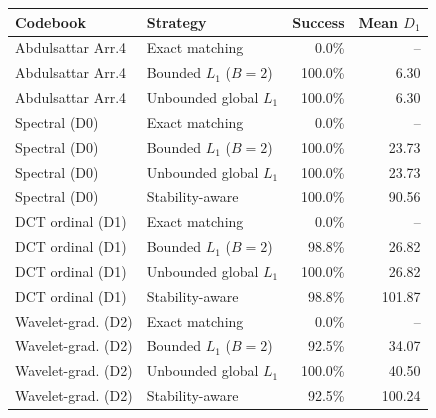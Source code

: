 \begin{tabular}{llrr}
\toprule
\textbf{Codebook} & \textbf{Strategy} & \textbf{Success} & \textbf{Mean $D_1$} \\
\midrule
Abdulsattar Arr.4 & Exact matching & 0.0\% & -- \\
Abdulsattar Arr.4 & Bounded $L_1$ ($B{=}2$) & 100.0\% & 6.30 \\
Abdulsattar Arr.4 & Unbounded global $L_1$ & 100.0\% & 6.30 \\
Spectral (D0) & Exact matching & 0.0\% & -- \\
Spectral (D0) & Bounded $L_1$ ($B{=}2$) & 100.0\% & 23.73 \\
Spectral (D0) & Unbounded global $L_1$ & 100.0\% & 23.73 \\
Spectral (D0) & Stability-aware & 100.0\% & 90.56 \\
DCT ordinal (D1) & Exact matching & 0.0\% & -- \\
DCT ordinal (D1) & Bounded $L_1$ ($B{=}2$) & 98.8\% & 26.82 \\
DCT ordinal (D1) & Unbounded global $L_1$ & 100.0\% & 26.82 \\
DCT ordinal (D1) & Stability-aware & 98.8\% & 101.87 \\
Wavelet-grad. (D2) & Exact matching & 0.0\% & -- \\
Wavelet-grad. (D2) & Bounded $L_1$ ($B{=}2$) & 92.5\% & 34.07 \\
Wavelet-grad. (D2) & Unbounded global $L_1$ & 100.0\% & 40.50 \\
Wavelet-grad. (D2) & Stability-aware & 92.5\% & 100.24 \\
\bottomrule
\end{tabular}
